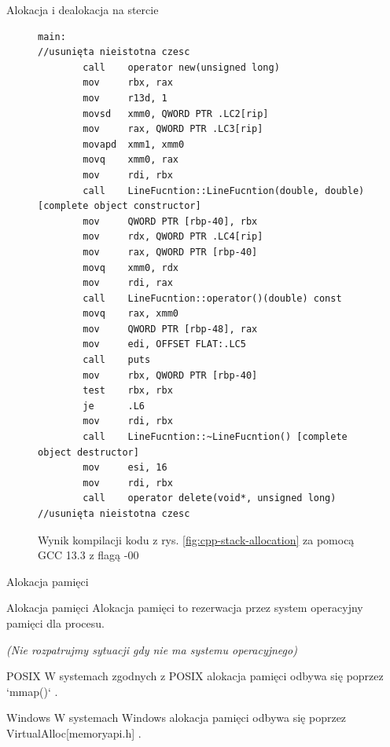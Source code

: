 \documentclass[xcolor=table]{beamer}
\begin{document}
\begin{frame}[containsverbatim]{Alokacja i dealokacja na stercie}
    \begin{figure}
        \tiny
    \begin{verbatim}
main:
//usunięta nieistotna czesc
        call    operator new(unsigned long)
        mov     rbx, rax
        mov     r13d, 1
        movsd   xmm0, QWORD PTR .LC2[rip]
        mov     rax, QWORD PTR .LC3[rip]
        movapd  xmm1, xmm0
        movq    xmm0, rax
        mov     rdi, rbx
        call    LineFucntion::LineFucntion(double, double) [complete object constructor]
        mov     QWORD PTR [rbp-40], rbx
        mov     rdx, QWORD PTR .LC4[rip]
        mov     rax, QWORD PTR [rbp-40]
        movq    xmm0, rdx
        mov     rdi, rax
        call    LineFucntion::operator()(double) const
        movq    rax, xmm0
        mov     QWORD PTR [rbp-48], rax
        mov     edi, OFFSET FLAT:.LC5
        call    puts
        mov     rbx, QWORD PTR [rbp-40]
        test    rbx, rbx
        je      .L6
        mov     rdi, rbx
        call    LineFucntion::~LineFucntion() [complete object destructor]
        mov     esi, 16
        mov     rdi, rbx
        call    operator delete(void*, unsigned long)
//usunięta nieistotna czesc 
        \end{verbatim}
                \label{fig:cpp-constructor-heap-asm}
                \caption{Wynik kompilacji kodu z rys. \ref{fig:cpp-stack-allocation} za pomocą GCC 13.3 z flagą -00}
        \end{figure}
\end{frame}

\begin{frame}{Alokacja pamięci}
    \begin{block}{Alokacja pamięci}
        Alokacja pamięci to rezerwacja przez system operacyjny pamięci dla procesu\cite{mmap-linux_man, virtual-alloc}.
        
        \textit{(Nie rozpatrujmy sytuacji gdy nie ma systemu operacyjnego)}
    \end{block}
    \begin{block}{POSIX}
        W systemach zgodnych z POSIX alokacja pamięci odbywa się poprzez  `mmap()` \cite{mmap-linux_man}.
    \end{block}

    \begin{block}{Windows}
        W systemach Windows alokacja pamięci odbywa się poprzez VirtualAlloc[memoryapi.h] \cite{virtual-alloc}.
    \end{block}
\end{frame}
\end{document}
